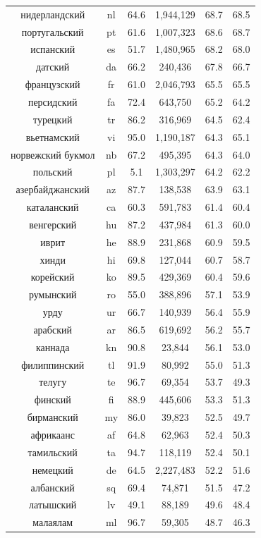 \begin{table}
{\begin{tabular}{|c|c|c||c|c|c|}
нидерландский & nl & 64.6 & 1,944,129 & 68.7 & 68.5\\
португальский & pt & 61.6 & 1,007,323 & 68.6 & 68.7\\
испанский & es & 51.7 & 1,480,965 & 68.2 & 68.0\\
датский & da & 66.2 & 240,436 & 67.8 & 66.7\\
французский & fr & 61.0 & 2,046,793 & 65.5 & 65.5\\
персидский & fa & 72.4 & 643,750 & 65.2 & 64.2\\
турецкий & tr & 86.2 & 316,969 & 64.5 & 62.4\\
вьетнамский & vi & 95.0 & 1,190,187 & 64.3 & 65.1\\
норвежский букмол & nb & 67.2 & 495,395 & 64.3 & 64.0\\
польский & pl & 5.1 & 1,303,297 & 64.2 & 62.2\\
азербайджанский & az & 87.7 & 138,538 & 63.9 & 63.1\\
каталанский & ca & 60.3 & 591,783 & 61.4 & 60.4\\
венгерский & hu & 87.2 & 437,984 & 61.3 & 60.0\\
иврит & he & 88.9 & 231,868 & 60.9 & 59.5\\
хинди & hi & 69.8 & 127,044 & 60.7 & 58.7\\
корейский & ko & 89.5 & 429,369 & 60.4 & 59.6\\
румынский & ro & 55.0 & 388,896 & 57.1 & 53.9\\
урду & ur & 66.7 & 140,939 & 56.4 & 55.9\\
арабский & ar & 86.5 & 619,692 & 56.2 & 55.7\\
каннада & kn & 90.8 & 23,844 & 56.1 & 53.0\\
филиппинский & tl & 91.9 & 80,992 & 55.0 & 51.3\\
телугу & te & 96.7 & 69,354 & 53.7 & 49.3\\
финский & fi & 88.9 & 445,606 & 53.3 & 51.3\\
бирманский & my & 86.0 & 39,823 & 52.5 & 49.7\\
африкаанс & af & 64.8 & 62,963 & 52.4 & 50.3\\
тамильский & ta & 94.7 & 118,119 & 52.4 & 50.1\\
немецкий & de & 64.5 & 2,227,483 & 52.2 & 51.6\\
албанский & sq & 69.4 & 74,871 & 51.5 & 47.2\\
латышский & lv & 49.1 & 88,189 & 49.6 & 48.4\\
малаялам & ml & 96.7 & 59,305 & 48.7 & 46.3\\

\end{tabular}}
\end{table}
